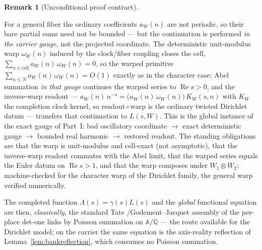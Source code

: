 \documentclass[11pt]{article}
\theoremstyle{definition}
\newtheorem{remark}[theorem]{Remark}
\renewcommand{\Re}{\operatorname{Re}}
\begin{document}
\begin{remark}[Unconditional proof contract]
\begin{enumerate}
For a general fiber the ordinary coefficients $a_W(n)$ are not periodic, so their bare partial sums need
not be bounded --- but the continuation is performed \emph{in the carrier gauge}, not the projected
coordinate. The deterministic unit-modulus warp $\omega_W(n)$ induced by the clock/fiber coupling closes
the cell, $\sum_{n\in\mathrm{cell}}a_W(n)\,\omega_W(n)=0$, so the warped primitive
$\sum_{n\le N}a_W(n)\,\omega_W(n)=O(1)$ exactly as in the character case; Abel summation \emph{in that
gauge} continues the warped series to $\Re s>0$, and the inverse-warp readout --- $a_W(n)\,n^{-s}=
\bigl(a_W(n)\,\omega_W(n)\bigr)\,K_W(s,n)$ with $K_W$ the completion clock kernel, so
$\mathrm{readout}\circ\mathrm{warp}$ is the ordinary twisted Dirichlet datum --- transfers that
continuation to $L(s,W)$. This is the global instance of the exact gauge of Part~I: bad oscillatory
coordinate $\to$ exact deterministic gauge $\to$ bounded real harmonic $\to$ restored readout. The
standing obligations are that the warp is unit-modulus and cell-exact (not asymptotic), that the
inverse-warp readout commutes with the Abel limit, that the warped series equals the Euler datum on
$\Re s>1$, and that the warp composes under $W_1\otimes W_2$; machine-checked for the character warp of the
Dirichlet family, the general warp verified numerically.

The completed function $\Lambda(s)=\gamma(s)L(s)$ and the \emph{global} functional equation are then,
\emph{classically}, the standard Tate \cite{Tate}/Godement--Jacquet \cite{GJa} assembly of the per-place
det-one links by Poisson summation on $\mathbb A/\mathbb Q$ --- the route available for the Dirichlet model;
on the carrier the same equation is the axis-reality reflection of Lemma~\ref{lem:bankreflection}, which
consumes no Poisson summation.


\end{enumerate}
\end{remark}
\end{document}

